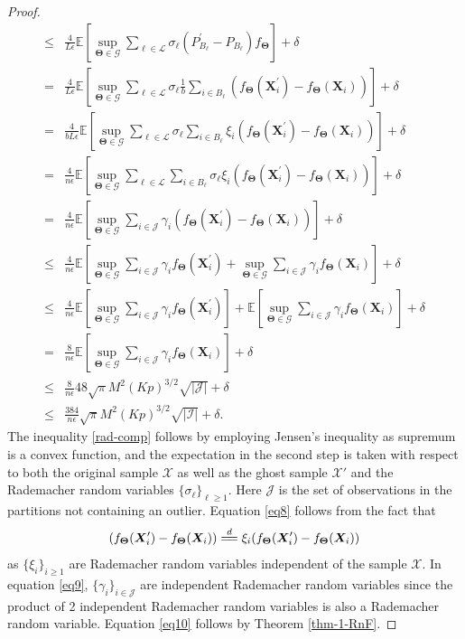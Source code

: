 \documentclass{article}
\newcommand{\bX}{\boldsymbol{X}}
\newcommand{\bTheta}{\boldsymbol{\Theta}}
\newcommand{\I}{\mathcal{I}}
\newcommand{\E}{\mathbb{E}}
\newcommand{\J}{\mathcal{J}}
\newcommand{\cL}{\mathcal{L}}
\begin{document}
\begin{proof}
\begin{align}
     \le & \frac{4}{L \epsilon}\E\left[\sup_{\bTheta \in \mathscr{G}}\sum_{\ell \in \cL}\sigma_\ell  (P^\prime_{B_\ell}-P_{B_\ell})f_{\bTheta} \right]+ \delta \label{rad-comp} \\
     = & \frac{4}{L \epsilon}\E\left[\sup_{\bTheta \in \mathscr{G}}\sum_{\ell \in \cL}\sigma_\ell  \frac{1}{b}\sum_{i \in B_\ell}(f_{\bTheta}(\bX_i^\prime)-f_{\bTheta}(\bX_i)) \right]+ \delta \nonumber \\
     = & \frac{4}{b L \epsilon}\E\left[\sup_{\bTheta \in \mathscr{G}}\sum_{\ell \in \cL}\sigma_\ell  \sum_{i \in B_\ell} \xi_i(f_{\bTheta}(\bX_i^\prime)-f_{\bTheta}(\bX_i)) \right]+ \delta \label{eq8} \\
     = & \frac{4}{n \epsilon}\E\left[\sup_{\bTheta \in \mathscr{G}}\sum_{\ell \in \cL}  \sum_{i \in B_\ell} \sigma_\ell \xi_i(f_{\bTheta}(\bX_i^\prime)-f_{\bTheta}(\bX_i)) \right]+ \delta \nonumber \\
     = & \frac{4}{n \epsilon}\E\left[\sup_{\bTheta \in \mathscr{G}} \sum_{i \in \J} \gamma_i (f_{\bTheta}(\bX_i^\prime)-f_{\bTheta}(\bX_i)) \right]+ \delta \label{eq9} \\
     \le &  \frac{4}{n \epsilon}\E\left[\sup_{\bTheta \in \mathscr{G}} \sum_{i \in \J} \gamma_i f_{\bTheta}(\bX_i^\prime)+ \sup_{\bTheta \in \mathscr{G}} \sum_{i \in \J} \gamma_i f_{\bTheta}(\bX_i) \right]+ \delta\\
     \le & \frac{4}{n \epsilon}\E\left[\sup_{\bTheta \in \mathscr{G}} \sum_{i \in \J} \gamma_i f_{\bTheta}(\bX_i^\prime)\right]+\E\left[ \sup_{\bTheta \in \mathscr{G}} \sum_{i \in \J} \gamma_i f_{\bTheta}(\bX_i) \right]+ \delta\\
     = & \frac{8}{n \epsilon}\E\left[\sup_{\bTheta \in \mathscr{G}} \sum_{i \in \J} \gamma_i f_{\bTheta}(\bX_i) \right]+ \delta \nonumber \\
     \le & \frac{8}{n \epsilon} 48 \sqrt{\pi}  M^2  (Kp)^{3/2}  \sqrt{|\J|} + \delta \label{eq10} \\
     \le & \frac{384}{n \epsilon}  \sqrt{\pi}  M^2  (Kp)^{3/2} \sqrt{|\I|} + \delta. \label{eq11}
\end{align}
\endgroup
The inequality \eqref{rad-comp} follows by employing Jensen's inequality as supremum is a convex function, and the expectation in the second step is taken with respect to both the original sample $\mathcal{X}$ as well as the ghost sample $\mathcal{X}'$ and the Rademacher random variables $\{\sigma_{\ell}\}_{\ell\ge 1}$.
Here $\J$ is the set of observations in the partitions not containing an outlier. Equation \eqref{eq8} follows from the fact that $$(f_{\bTheta}(\bX_i^\prime)-f_{\bTheta}(\bX_i)) \overset{d}{=\joinrel=} \xi_i(f_{\bTheta}(\bX_i^\prime)-f_{\bTheta}(\bX_i))$$ as $\{\xi_i\}_{i\ge 1}$ are Rademacher random variables independent of the sample $\mathcal{X}$. In equation \eqref{eq9}, $\{\gamma_i\}_{i \in \mathcal{J}}$ are independent Rademacher random variables since the product of 2 independent Rademacher random variables is also a Rademacher random variable. Equation \eqref{eq10} follows by Theorem \ref{thm-1-RnF}.

\end{proof}
\end{document}
